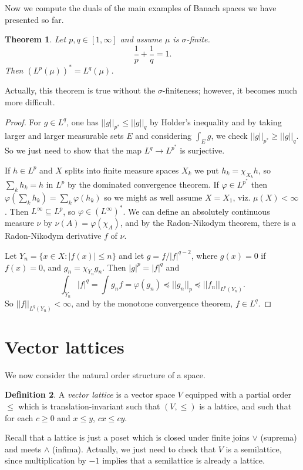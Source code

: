 \documentclass[12pt]{report}
\newcommand{\dfn}[1]{\emph{#1}\index{#1}}
\newtheorem{theorem}{Theorem}[chapter]
\theoremstyle{definition}
\newtheorem{definition}[theorem]{Definition}
\begin{document}
    Now we compute the duals of the main examples of Banach spaces we have presented so far.
\begin{theorem}
    Let $p, q \in [1, \infty]$ and assume $\mu$ is $\sigma$-finite.
    $$\frac{1}{p} + \frac{1}{q} = 1.$$
    Then $(L^p(\mu))^* = L^q(\mu)$.
\end{theorem}
    Actually, this theorem is true without the $\sigma$-finiteness; however, it becomes much more difficult.
\begin{proof}
    For $g \in L^q$, one has $||g||_{p^*} \leq ||g||_q$ by Holder's inequality and by taking larger and larger measurable sets $E$ and considering $\int_E g$, we check $||g||_{p^*} \geq ||g||_q$. So we just need to show that the map $L^q \to L^{p^*}$ is surjective.
    
    If $h \in L^p$ and $X$ splits into finite measure spaces $X_k$ we put $h_k = \chi_{X_k}h$, so $\sum_k h_k = h$ in $L^p$ by the dominated convergence theorem. If $\varphi \in L^{p^*}$ then $\varphi(\sum_k h_k) = \sum_k \varphi(h_k)$ so we might as well assume $X = X_1$, viz. $\mu(X) < \infty$. Then $L^\infty \subseteq L^p$, so $\varphi \in (L^\infty)^*$. We can define an absolutely continuous measure $\nu$ by $\nu(A) = \varphi(\chi_A)$, and by the Radon-Nikodym theorem, there is a Radon-Nikodym derivative $f$ of $\nu$.
    
    Let $Y_n = \{x \in X: |f(x)| \leq n\}$ and let $g = f/|f|^{q-2}$, where $g(x) = 0$ if $f(x) = 0$, and $g_n = \chi_{Y_n}g_n$. Then $|g|^p = |f|^q$ and
    $$\int_{Y_n} |f|^q = \int g_nf = \varphi(g_n) \preceq ||g_n||_p \preceq ||f_n||_{L^p(Y_n)}.$$
    So $||f||_{L^q(Y_n)} < \infty$, and by the monotone convergence theorem, $f \in L^q$.
\end{proof}

\section{Vector lattices}
    We now consider the natural order structure of a space.
\begin{definition}
    A \dfn{vector lattice} is a vector space $V$ equipped with a partial order $\leq$ which is translation-invariant such that $(V, \leq)$ is a lattice, and such that for each $c \geq 0$ and $x \leq y$, $cx \leq cy$.
\end{definition}
    Recall that a lattice is just a poset which is closed under finite joins $\vee$ (suprema) and meets $\wedge$ (infima). Actually, we just need to check that $V$ is a semilattice, since multiplication by $-1$ implies that a semilattice is already a lattice.
    
\end{document}

